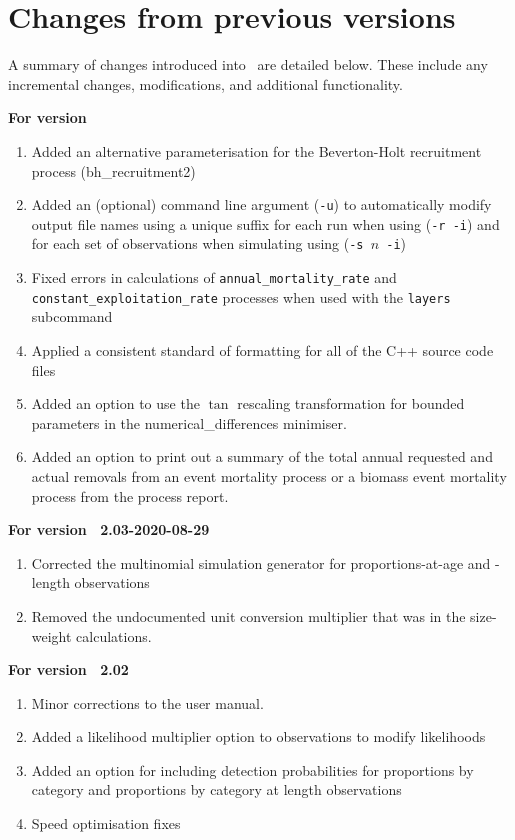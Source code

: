 \section{Changes from previous versions}

A summary of changes introduced into \SPM\ are detailed below. These include any incremental changes, modifications, and additional functionality.

\textbf{For version \SPM\ \VER}
\begin{enumerate}
  \item Added an alternative parameterisation for the Beverton-Holt recruitment process (bh\_recruitment2)
  \item Added an (optional) command line argument (\texttt{-u}) to automatically modify output file names using a unique suffix for each run when using (\texttt{-r -i}) and for each set of observations when simulating using (\texttt{-s \emph{$n$}\ -i})
	\item Fixed errors in calculations of \texttt{annual\_mortality\_rate} and \texttt{constant\_exploitation\_rate} processes when used with the \texttt{layers} subcommand
	\item Applied a consistent standard of formatting for all of the C++ source code files
	\item Added an option to use the $\tan$ rescaling transformation for bounded parameters in the numerical\_differences minimiser.
	\item Added an option to print out a summary of the total annual requested and actual removals from an event mortality process or a biomass event mortality process from the process report.
\end{enumerate}

\textbf{For version \SPM\ 2.03-2020-08-29}
\begin{enumerate}
  \item Corrected the multinomial simulation generator for proportions-at-age and -length observations
	\item Removed the undocumented unit conversion multiplier that was in the size-weight calculations.
\end{enumerate}

\textbf{For version \SPM\ 2.02}

\begin{enumerate}
  \item Minor corrections to the user manual.
	\item Added a likelihood multiplier option to observations to modify likelihoods
	\item Added an option for including detection probabilities for proportions by category and proportions by category at length observations
	\item Speed optimisation fixes
\end{enumerate}

